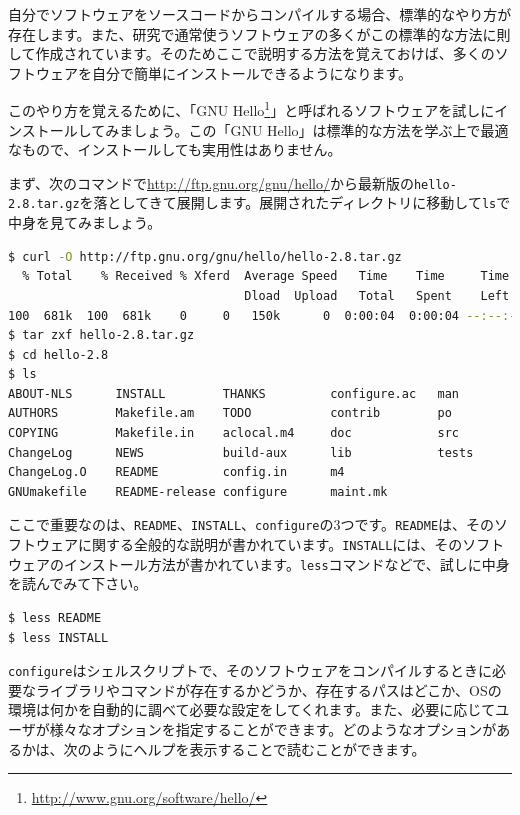 自分でソフトウェアをソースコードからコンパイルする場合、標準的なやり方が存在します。また、研究で通常使うソフトウェアの多くがこの標準的な方法に則して作成されています。そのためここで説明する方法を覚えておけば、多くのソフトウェアを自分で簡単にインストールできるようになります。

このやり方を覚えるために、「GNU Hello\footnote{\url{http://www.gnu.org/software/hello/}}」と呼ばれるソフトウェアを試しにインストールしてみましょう。この「GNU Hello」は標準的な方法を学ぶ上で最適なもので、インストールしても実用性はありません。

まず、次のコマンドで\url{http://ftp.gnu.org/gnu/hello/}から最新版の\texttt{hello-2.8.tar.gz}を落としてきて展開します。展開されたディレクトリに移動して\texttt{ls}で中身を見てみましょう。

\begin{lstlisting}[language=bash]
$ curl -O http://ftp.gnu.org/gnu/hello/hello-2.8.tar.gz
  % Total    % Received % Xferd  Average Speed   Time    Time     Time  Current
                                 Dload  Upload   Total   Spent    Left  Speed
100  681k  100  681k    0     0   150k      0  0:00:04  0:00:04 --:--:--  166k
$ tar zxf hello-2.8.tar.gz
$ cd hello-2.8 
$ ls
ABOUT-NLS      INSTALL        THANKS         configure.ac   man
AUTHORS        Makefile.am    TODO           contrib        po
COPYING        Makefile.in    aclocal.m4     doc            src
ChangeLog      NEWS           build-aux      lib            tests
ChangeLog.O    README         config.in      m4
GNUmakefile    README-release configure      maint.mk
\end{lstlisting}

ここで重要なのは、\texttt{README}、\texttt{INSTALL}、\texttt{configure}の3つです。\texttt{README}は、そのソフトウェアに関する全般的な説明が書かれています。\texttt{INSTALL}には、そのソフトウェアのインストール方法が書かれています。\texttt{less}コマンドなどで、試しに中身を読んでみて下さい。

\begin{lstlisting}[language=bash]
$ less README
$ less INSTALL
\end{lstlisting}

\texttt{configure}はシェルスクリプトで、そのソフトウェアをコンパイルするときに必要なライブラリやコマンドが存在するかどうか、存在するパスはどこか、OSの環境は何かを自動的に調べて必要な設定をしてくれます。また、必要に応じてユーザが様々なオプションを指定することができます。どのようなオプションがあるかは、次のようにヘルプを表示することで読むことができます。

